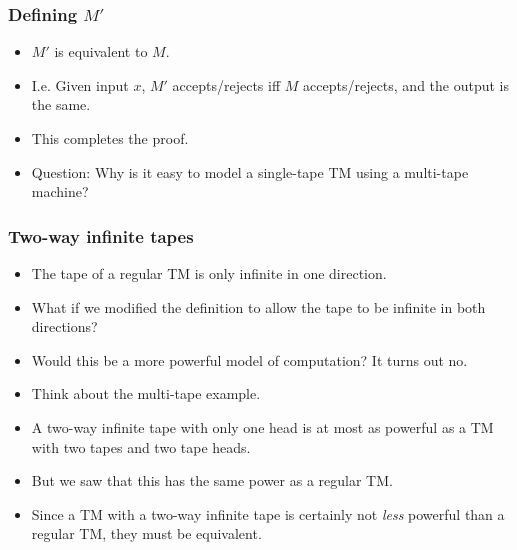 \documentclass[handout]{beamer}
\begin{document}
\begin{frame}
\frametitle{Defining $M'$}
\begin{itemize}
\item $M'$ is equivalent to $M$.
\vspace{0.4cm}
\item I.e. Given input $x$, $M'$ accepts/rejects iff $M$ accepts/rejects, and the output is the same.
\vspace{0.4cm}
\item This completes the proof.
\vspace{0.4cm}
\item Question: Why is it easy to model a single-tape TM using a multi-tape machine?
\end{itemize}

\end{frame}

\begin{frame}
\frametitle{Two-way infinite tapes}
\begin{itemize}
\item The tape of a regular TM is only infinite in one direction.
\vspace{0.2cm} 
\item What if we modified the definition to allow the tape to be infinite in both directions? 
\vspace{0.2cm}
\item Would this be a more powerful model of computation? It turns out no. 
\vspace{0.2cm}
\item Think about the multi-tape example. 
\vspace{0.2cm}
\item A two-way infinite tape with only one head is at most as powerful as a TM with two tapes and two tape heads. 
\vspace{0.2cm}
\item But we saw that this has the same power as a regular TM. 
\vspace{0.2cm}
\item Since a TM with a two-way infinite tape is certainly not \emph{less} powerful than a regular TM, they must be equivalent. 
\end{itemize}

\end{frame}
\end{document}
